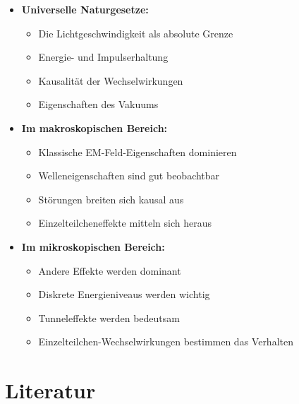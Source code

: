 \documentclass[12pt,a4paper]{article}
\begin{document}
\begin{itemize}
    \item \textbf{Universelle Naturgesetze:}
    \begin{itemize}
        \item Die Lichtgeschwindigkeit als absolute Grenze
        \item Energie- und Impulserhaltung
        \item Kausalität der Wechselwirkungen
        \item Eigenschaften des Vakuums
    \end{itemize}

    \item \textbf{Im makroskopischen Bereich:}
    \begin{itemize}
        \item Klassische EM-Feld-Eigenschaften dominieren
        \item Welleneigenschaften sind gut beobachtbar
        \item Störungen breiten sich kausal aus
        \item Einzelteilcheneffekte mitteln sich heraus
    \end{itemize}

    \item \textbf{Im mikroskopischen Bereich:}
    \begin{itemize}
        \item Andere Effekte werden dominant
        \item Diskrete Energieniveaus werden wichtig
        \item Tunneleffekte werden bedeutsam
        \item Einzelteilchen-Wechselwirkungen bestimmen das Verhalten
    \end{itemize}
\end{itemize}

\section*{Literatur}
\end{document}
